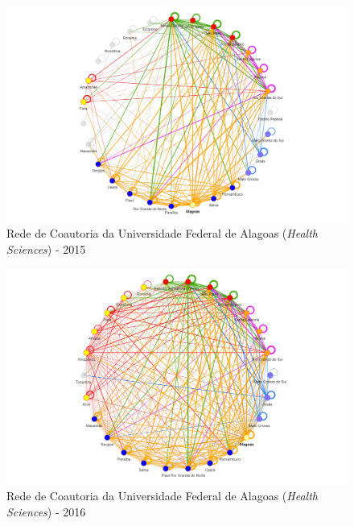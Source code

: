 \begin{figure}[H]
	\centering
	\includegraphics[width=\linewidth]{Imagens/rede-al-2015.pdf}
	\caption{Rede de Coautoria da Universidade Federal de Alagoas (\textit{Health Sciences}) - 2015}
	\label{Rede de Coautoria - UF AL 2015}
\end{figure}

\begin{figure}[H]
	\centering
	\includegraphics[width=\linewidth]{Imagens/rede-al-2016.pdf}
	\caption{Rede de Coautoria da Universidade Federal de Alagoas (\textit{Health Sciences}) - 2016}
	\label{Rede de Coautoria - UF AL 2016}
\end{figure}

